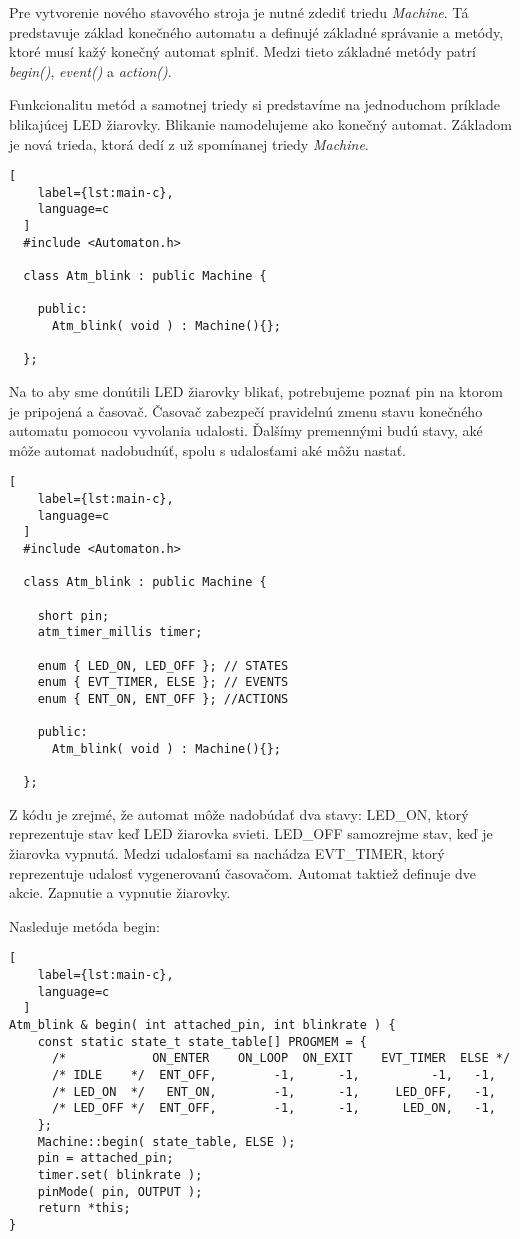 \noindent \par Pre vytvorenie nového stavového stroja je nutné zdediť triedu \textit{Machine}.
Tá predstavuje základ konečného automatu a definujé základné správanie a metódy, ktoré musí kažý konečný automat splniť. Medzi tieto základné metódy patrí \textit{begin()}, \textit{event()} a \textit{action()}. 
\par Funkcionalitu metód a samotnej triedy si predstavíme na jednoduchom príklade blikajúcej LED žiarovky. Blikanie namodelujeme ako konečný automat. Základom je nová trieda, ktorá dedí z už spomínanej triedy \textit{Machine}.
\begin{lstlisting}[
    label={lst:main-c},
    language=c
  ]
  #include <Automaton.h>

  class Atm_blink : public Machine {
  
    public:
      Atm_blink( void ) : Machine(){};
  
  };
\end{lstlisting}

Na to aby sme donútili LED žiarovky blikať, potrebujeme poznať pin na ktorom je 
pripojená a časovač. Časovač zabezpečí pravidelnú zmenu stavu konečného automatu pomocou vyvolania udalosti. Ďalšímy premennými budú stavy, aké môže automat nadobudnúť, spolu s udalosťami aké môžu nastať.

\begin{lstlisting}[
    label={lst:main-c},
    language=c
  ]
  #include <Automaton.h>

  class Atm_blink : public Machine { 

    short pin;
    atm_timer_millis timer;

    enum { LED_ON, LED_OFF }; // STATES
    enum { EVT_TIMER, ELSE }; // EVENTS
    enum { ENT_ON, ENT_OFF }; //ACTIONS

    public:
      Atm_blink( void ) : Machine(){};
  
  };
\end{lstlisting}
Z kódu je zrejmé, že automat môže nadobúdať dva stavy: LED\_ON, ktorý reprezentuje stav keď LED žiarovka svieti. LED\_OFF samozrejme stav, keď je žiarovka vypnutá. Medzi udalosťami sa nachádza EVT\_TIMER, ktorý reprezentuje udalosť vygenerovanú časovačom. Automat taktiež definuje dve akcie. Zapnutie a vypnutie žiarovky.
\par Nasleduje metóda begin:
\begin{lstlisting}[
    label={lst:main-c},
    language=c
  ]
Atm_blink & begin( int attached_pin, int blinkrate ) {
    const static state_t state_table[] PROGMEM = {
      /*            ON_ENTER    ON_LOOP  ON_EXIT    EVT_TIMER  ELSE */
      /* IDLE    */  ENT_OFF,        -1,      -1,          -1,   -1,
      /* LED_ON  */   ENT_ON,        -1,      -1,     LED_OFF,   -1,
      /* LED_OFF */  ENT_OFF,        -1,      -1,      LED_ON,   -1,
    };
    Machine::begin( state_table, ELSE );
    pin = attached_pin; 
    timer.set( blinkrate ); 
    pinMode( pin, OUTPUT ); 
    return *this;          
}
\end{lstlisting}

